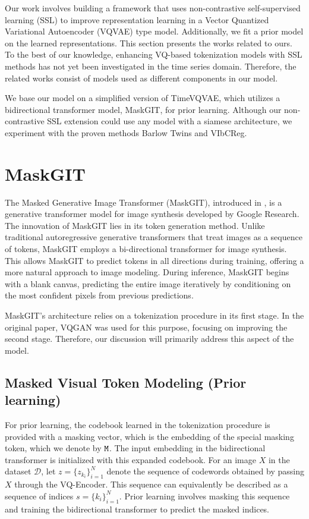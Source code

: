 \documentclass[../../thesis.tex]{subfiles}
\begin{document}
Our work involves building a framework that uses non-contrastive self-supervised learning (SSL) to improve representation learning in a Vector Quantized Variational Autoencoder (VQVAE) type model. Additionally, we fit a prior model on the learned representations. This section presents the works related to ours. To the best of our knowledge, enhancing VQ-based tokenization models with SSL methods has not yet been investigated in the time series domain. Therefore, the related works consist of models used as different components in our model.\newline

We base our model on a simplified version of TimeVQVAE, which utilizes a bidirectional transformer model, MaskGIT, for prior learning. Although our non-contrastive SSL extension could use any model with a siamese architecture, we experiment with the proven methods Barlow Twins and VIbCReg.

\section{MaskGIT}

The Masked Generative Image Transformer (MaskGIT), introduced in \cite{chang2022maskgit}, is a generative transformer model for image synthesis developed by Google Research. The innovation of MaskGIT lies in its token generation method. Unlike traditional autoregressive generative transformers that treat images as a sequence of tokens, MaskGIT employs a bi-directional transformer for image synthesis. This allows MaskGIT to predict tokens in all directions during training, offering a more natural approach to image modeling. During inference, MaskGIT begins with a blank canvas, predicting the entire image iteratively by conditioning on the most confident pixels from previous predictions.\newline

MaskGIT's architecture relies on a tokenization procedure in its first stage. In the original paper, VQGAN \cite{VQGAN} was used for this purpose, focusing on improving the second stage. Therefore, our discussion will primarily address this aspect of the model.

\subsection{Masked Visual Token Modeling (Prior learning)}

For prior learning, the codebook learned in the tokenization procedure is provided with a masking vector, which is the embedding of the special masking token, which we denote by $\texttt{M}$. The input embedding in the bidirectional transformer is initialized with this expanded codebook. For an image $X$ in the dataset $\mathcal{D}$, let $z = \{z_{k_i}\}_{i=1}^N$ denote the sequence of codewords obtained by passing $X$ through the VQ-Encoder. This sequence can equivalently be described as a sequence of indices $s = \{k_i\}_{i=1}^N$. Prior learning involves masking this sequence and training the bidirectional transformer to predict the masked indices.
\newline
\end{document}
